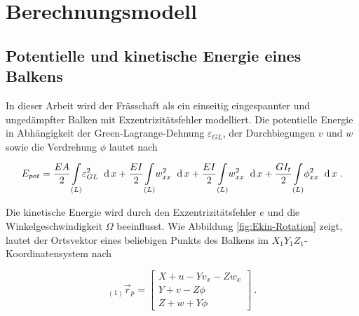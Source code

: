 	\pagestyle{fancy}
	\section{Berechnungsmodell}\label{sec:Berechnungsmodell}
	\subsection{Potentielle und kinetische Energie eines Balkens}\label{sec:E-Berechnung}
	
	In dieser Arbeit wird der Frässchaft als ein einseitig eingespannter und ungedämpfter Balken mit Exzentrizitätsfehler modelliert. Die potentielle Energie in Abhängigkeit der Green-Lagrange-Dehnung $ \varepsilon_{GL} $, der Durchbiegungen $ v $ und $ w $ sowie die Verdrehung $ \phi $ lautet nach \cite{gross2004technische}
	
	\begin{equation}\label{equ:Epot}
	E_{pot} = \dfrac{EA}{2} \underset{(L)}{\int} \varepsilon_{GL}^{2} \ \dx + \dfrac{EI}{2} \underset{(L)}{\int} w_{xx}^{2} \ \dx + \dfrac{EI}{2} \underset{(L)}{\int} w_{xx}^{2} \ \dx + \dfrac{GI_{t}}{2} \underset{(L)}{\int} \phi_{xx}^{2} \ \dx \ .
	\end{equation}
	
	Die kinetische Energie wird durch den Exzentrizitätsfehler $ e $ und die Winkelgeschwindigkeit $ \Omega $ beeinflusst. Wie Abbildung \ref{fig:Ekin-Rotation} zeigt,
	lautet der Ortsvektor eines beliebigen Punkts des Balkens im $ X_{1}Y_{1}Z_{1} $-Koordinatensystem nach \cite{wauer2014kontinuumsschwingungen}
	
	\begin{equation}\label{equ:Vektor-(1)rp}
	_{\left( 1\right) }\vec{r}_{p} = 
	\left[
	\begin{array}{l}
	X+u-Yv_{x}-Zw_{x}\\
	Y+v-Z\phi\\
	Z+w+Y\phi
	\end{array}
	\right] \ .  
	\end{equation}
	
